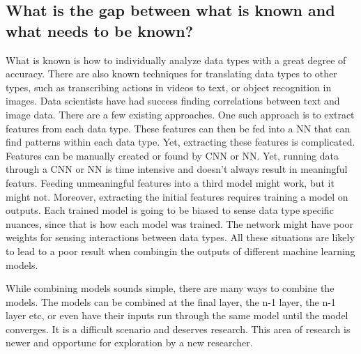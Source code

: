 \subsection{What is the gap between what is known and what needs to be known?}

What is known is how to individually analyze data types with a great degree of accuracy.  There are also known techniques for translating data types to other types, such as transcribing actions in videos to text, or object recognition in images.  Data scientists have had success finding correlations between text and image data.  There are a few existing approaches.  One such approach is to extract features from each data type.  These features can then be fed into a NN that can find patterns within each data type.  Yet, extracting these features is complicated.  Features can be manually created or found by CNN or NN.  Yet, running data through a CNN or NN is time intensive and doesn't always result in meaningful featurs.  Feeding unmeaningful features into a third model might work, but it might not.  Moreover, extracting the initial features requires training a model on outputs. Each trained model is going to be biased to sense data type specific nuances, since that is how each model was trained.  The network might have poor weights for sensing interactions between data types.  All these situations are likely to lead to a poor result when combingin the outputs of different machine learning models.

While combining models sounds simple, there are many ways to combine the models.  The models can be combined at the final layer, the n-1 layer, the n-1 layer etc, or even have their inputs run through the same model until the model converges.  It is a difficult scenario and deserves research. This area of research is newer and opportune for exploration by a new researcher.  
